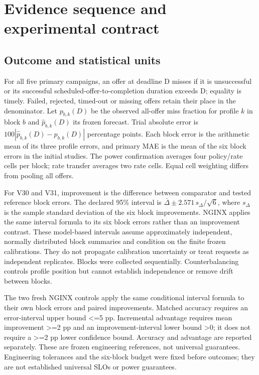 \documentclass[11pt,a4paper]{article}
\begin{document}
\section{Evidence sequence and experimental contract}

\subsection{Outcome and statistical units}

For all five primary campaigns, an offer at deadline D misses if
it is unsuccessful or its successful
scheduled-offer-to-completion duration exceeds D; equality is timely. Failed,
rejected, timed-out or missing offers retain their place in the denominator.
Let $p_{b,k}(D)$ be the observed all-offer miss fraction for profile $k$ in block $b$
and $\hat p_{b,k}(D)$ its frozen forecast. Trial absolute error is
$100\left|\hat p_{b,k}(D)-p_{b,k}(D)\right|$ percentage points. Each block error is the
arithmetic mean of its three profile errors, and primary MAE is the mean of
the six block errors in the initial studies. The power confirmation averages
four policy/rate cells per block; rate transfer averages two rate cells. Equal
cell weighting differs from pooling all offers.

For V30 and V31, improvement is the difference between comparator and tested
reference block errors. The declared 95\% interval is
$\bar\Delta \pm 2.571\,s_\Delta/\sqrt{6}$, where $s_\Delta$ is the sample
standard deviation of the six block improvements. NGINX applies the same interval
formula to its six block errors rather than an improvement contrast. These
model-based intervals assume approximately independent, normally distributed
block summaries and condition on the finite frozen calibrations. They do not
propagate calibration uncertainty or treat requests as independent replicates.
Blocks were collected sequentially. Counterbalancing controls profile position
but cannot establish independence or remove drift between blocks.

The two fresh NGINX controls apply the same conditional interval formula to
their own block errors and paired improvements. Matched accuracy requires an
error-interval upper bound <=5 pp. Incremental advantage requires mean
improvement >=2 pp and an improvement-interval lower bound >0; it does not
require a >=2 pp lower confidence bound. Accuracy and advantage are reported
separately. These are frozen engineering references, not universal guarantees.
Engineering tolerances and the six-block budget were fixed before outcomes;
they are not established universal SLOs or power guarantees.
\end{document}
